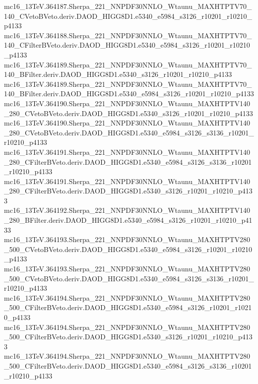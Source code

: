 \begin{footnotesize}
mc16\_13TeV.364187.Sherpa\_221\_NNPDF30NNLO\_Wtaunu\_MAXHTPTV70\_140\_CVetoBVeto.deriv.DAOD\_HIGG8D1.e5340\_e5984\_s3126\_r10201\_r10210\_p4133 \\
mc16\_13TeV.364188.Sherpa\_221\_NNPDF30NNLO\_Wtaunu\_MAXHTPTV70\_140\_CFilterBVeto.deriv.DAOD\_HIGG8D1.e5340\_e5984\_s3126\_r10201\_r10210\_p4133 \\
mc16\_13TeV.364189.Sherpa\_221\_NNPDF30NNLO\_Wtaunu\_MAXHTPTV70\_140\_BFilter.deriv.DAOD\_HIGG8D1.e5340\_s3126\_r10201\_r10210\_p4133 \\
mc16\_13TeV.364189.Sherpa\_221\_NNPDF30NNLO\_Wtaunu\_MAXHTPTV70\_140\_BFilter.deriv.DAOD\_HIGG8D1.e5340\_e5984\_s3126\_r10201\_r10210\_p4133 \\
mc16\_13TeV.364190.Sherpa\_221\_NNPDF30NNLO\_Wtaunu\_MAXHTPTV140\_280\_CVetoBVeto.deriv.DAOD\_HIGG8D1.e5340\_s3126\_r10201\_r10210\_p4133 \\
mc16\_13TeV.364190.Sherpa\_221\_NNPDF30NNLO\_Wtaunu\_MAXHTPTV140\_280\_CVetoBVeto.deriv.DAOD\_HIGG8D1.e5340\_e5984\_s3126\_s3136\_r10201\_r10210\_p4133 \\
mc16\_13TeV.364191.Sherpa\_221\_NNPDF30NNLO\_Wtaunu\_MAXHTPTV140\_280\_CFilterBVeto.deriv.DAOD\_HIGG8D1.e5340\_e5984\_s3126\_s3136\_r10201\_r10210\_p4133 \\
mc16\_13TeV.364191.Sherpa\_221\_NNPDF30NNLO\_Wtaunu\_MAXHTPTV140\_280\_CFilterBVeto.deriv.DAOD\_HIGG8D1.e5340\_s3126\_r10201\_r10210\_p4133 \\
mc16\_13TeV.364192.Sherpa\_221\_NNPDF30NNLO\_Wtaunu\_MAXHTPTV140\_280\_BFilter.deriv.DAOD\_HIGG8D1.e5340\_e5984\_s3126\_r10201\_r10210\_p4133 \\
mc16\_13TeV.364193.Sherpa\_221\_NNPDF30NNLO\_Wtaunu\_MAXHTPTV280\_500\_CVetoBVeto.deriv.DAOD\_HIGG8D1.e5340\_e5984\_s3126\_r10201\_r10210\_p4133 \\
mc16\_13TeV.364193.Sherpa\_221\_NNPDF30NNLO\_Wtaunu\_MAXHTPTV280\_500\_CVetoBVeto.deriv.DAOD\_HIGG8D1.e5340\_e5984\_s3126\_s3136\_r10201\_r10210\_p4133 \\
mc16\_13TeV.364194.Sherpa\_221\_NNPDF30NNLO\_Wtaunu\_MAXHTPTV280\_500\_CFilterBVeto.deriv.DAOD\_HIGG8D1.e5340\_e5984\_s3126\_r10201\_r10210\_p4133 \\
mc16\_13TeV.364194.Sherpa\_221\_NNPDF30NNLO\_Wtaunu\_MAXHTPTV280\_500\_CFilterBVeto.deriv.DAOD\_HIGG8D1.e5340\_s3126\_r10201\_r10210\_p4133 \\
mc16\_13TeV.364194.Sherpa\_221\_NNPDF30NNLO\_Wtaunu\_MAXHTPTV280\_500\_CFilterBVeto.deriv.DAOD\_HIGG8D1.e5340\_e5984\_s3126\_s3136\_r10201\_r10210\_p4133 \\

\end{footnotesize}
